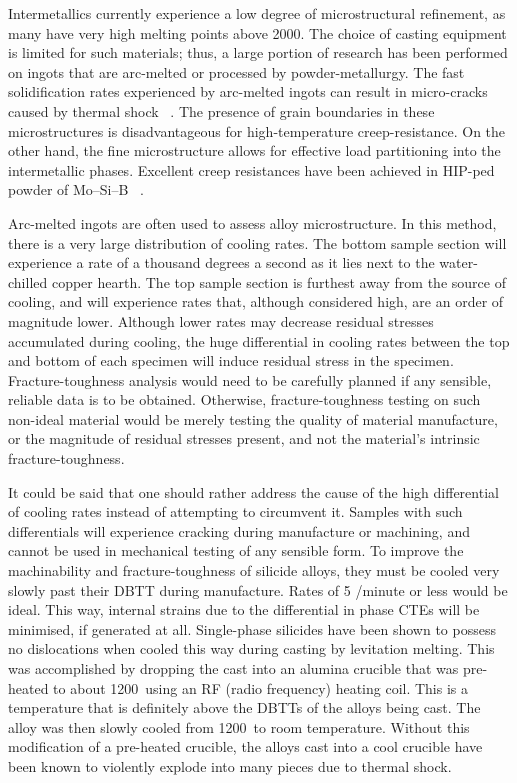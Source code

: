 Intermetallics currently experience a low degree of microstructural refinement, as many have very high melting points above 2000\celsius.  The choice of casting equipment is limited for such materials; thus, a large portion of research has been performed on ingots that are arc-melted or processed by powder-metallurgy.  The fast solidification rates experienced by arc-melted ingots can result in micro-cracks caused by thermal shock ~\cite{raj95a}.  The presence of grain boundaries in these microstructures is disadvantageous for high-temperature creep-resistance.  On the other hand, the fine microstructure allows for effective load partitioning into the intermetallic phases.  Excellent creep resistances have been achieved in HIP-ped powder of Mo--Si--B ~\cite{kumar07, jain10}.

Arc-melted ingots are often used to assess alloy microstructure.  In this method, there is a very large distribution of cooling rates.  The bottom sample section will experience a rate of a thousand degrees a second as it lies next to the water-chilled copper hearth.  The top sample section is furthest away from the source of cooling, and will experience rates that, although considered high, are an order of magnitude lower.  Although lower rates may decrease residual stresses accumulated during cooling, the huge differential in cooling rates between the top and bottom of each specimen will induce residual stress in the specimen.  Fracture-toughness analysis would need to be carefully planned if any sensible, reliable data is to be obtained.  Otherwise, fracture-toughness testing on such non-ideal material would be merely testing the quality of material manufacture, or the magnitude of residual stresses present, and not the material’s intrinsic fracture-toughness.

It could be said that one should rather address the cause of the high differential of cooling rates instead of attempting to circumvent it.  Samples with such differentials will experience cracking during manufacture or machining, and cannot be used in mechanical testing of any sensible form.  To improve the machinability and fracture-toughness of silicide alloys, they must be cooled very slowly past their DBTT during manufacture.  Rates of 5 \celsius/minute or less would be ideal.  This way, internal strains due to the differential in phase CTEs will be minimised, if generated at all.  Single-phase silicides have been shown to possess no dislocations when cooled this way during casting by levitation melting.  This was accomplished by dropping the cast into an alumina crucible that was pre-heated to about 1200\celsius\ using an RF (radio frequency) heating coil.  This is a temperature that is definitely above the DBTTs of the alloys being cast.  The alloy was then slowly cooled from 1200\celsius\ to room temperature.  Without this modification of a pre-heated crucible, the alloys cast into a cool crucible have been known to violently explode into many pieces due to thermal shock.

